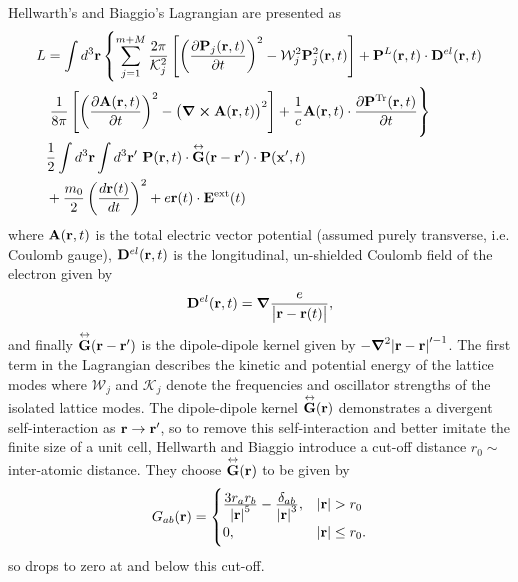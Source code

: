 Hellwarth's and Biaggio's Lagrangian are presented as
\begin{equation} \label{eqn:hi_lag}
    \begin{aligned}
        L &= \int d^3 \vb{r} \left\{ \sum_{j = 1}^{m+M} \frac{2\pi}{\mathcal{K}_j^2} \left[ \left( \frac{\partial \vb{P}_j(\vb{r}, t)}{\partial t} \right)^2 - \mathcal{W}_j^2 \vb{P}_j^2(\vb{r}, t)\right] + \vb{P}^L(\vb{r}, t) \cdot \vb{D}^{el}(\vb{r}, t) \right. \\
        &\left. \frac{1}{8\pi} \left[ \left( \frac{\partial \vb{A}(\vb{r}, t)}{\partial t} \right)^2 - \left( \curl{\vb{A}(\vb{r}, t)} \right)^2 \right] + \frac{1}{c} \vb{A}(\vb{r}, t) \cdot \frac{\partial \vb{P}^{\text{Tr}}(\vb{r}, t)}{\partial t} \right\} \\
        &\frac{1}{2} \int d^3\vb{r} \int d^3\vb{r}'\ \vb{P}(\vb{r}, t) \cdot \overset{\leftrightarrow}{\vb{G}}(\vb{r} - \vb{r}') \cdot \vb{P}(\vb{x}', t) \\
        &+\frac{m_0}{2} \left( \frac{d \vb{r}(t)}{dt} \right)^2 + e \vb{r}(t) \cdot \vb{E}^{\text{ext}}(t)
    \end{aligned}
\end{equation}
where $\vb{A}(\vb{r}, t)$ is the total electric vector potential (assumed purely transverse, i.e. Coulomb gauge), $\vb{D}^{el}(\vb{r}, t)$ is the longitudinal, un-shielded Coulomb field of the electron given by
\begin{equation}
    \vb{D}^{el}(\vb{r}, t) = \grad \frac{e}{\abs{\vb{r} - \vb{r}(t)}},
\end{equation}
and finally $\overset{\leftrightarrow}{\vb{G}}(\vb{r} - \vb{r}')$ is the dipole-dipole kernel given by $-\grad^2 \abs{\vb{r} - \vb{r}}'^{-1}$. The first term in the Lagrangian describes the kinetic and potential energy of the lattice modes where $\mathcal{W}_j$ and  $\mathcal{K}_j$ denote the frequencies and oscillator strengths of the isolated lattice modes. The dipole-dipole kernel $\overset{\leftrightarrow}{\vb{G}}(\vb{r})$ demonstrates a divergent self-interaction as $\vb{r} \to \vb{r}'$, so to remove this self-interaction and better imitate the finite size of a unit cell, Hellwarth and Biaggio introduce a cut-off distance $r_0 \sim$ inter-atomic distance. They choose $\overset{\leftrightarrow}{\vb{G}}(\vb{r})$ to be given by
\begin{equation}
    G_{ab}(\vb{r}) = 
    \begin{cases}
        \frac{\displaystyle 3r_a r_b}{\displaystyle \abs{\vb{r}}^5} - \frac{\displaystyle \delta_{ab}}{\displaystyle \abs{\vb{r}}^3}, & \abs{\vb{r}} > r_0 \\
        0, & \abs{\vb{r}} \leq r_0.
    \end{cases}
\end{equation}
so drops to zero at and below this cut-off.

